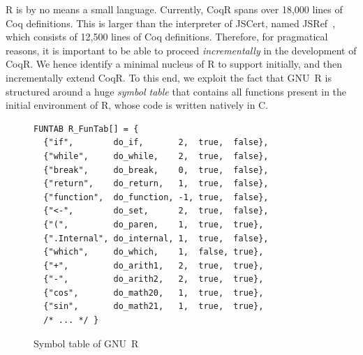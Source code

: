 \documentclass[
    sigplan,
    10pt,
    review, %
    natbib=false %
 ]{acmart}
\newcommand\mb[1]{\todo[color=purple!20,size=\scriptsize]{#1}}
\newcommand\mbi[1]{\todo[color=purple!20,inline]{#1}}
\newcommand\et[1]{\todo[color=blue!20,size=\scriptsize]{#1}}
\newcommand\CoqR{CoqR}
\begin{document}
R is by no means a small language.
Currently, \CoqR{} spans over 18,000 lines of Coq definitions.
This is larger than the interpreter of JSCert, named JSRef~\parencite{popl14jscert}, which consists of 12,500 lines of Coq definitions.
Therefore, for pragmatical reasons, it is important to be able to proceed {\em incrementally} in the development of \CoqR{}.
We hence identify a minimal nucleus of R to support initially, and then incrementally extend \CoqR{}.
To this end, we exploit the fact that GNU~R is structured around a huge {\em symbol table} that contains all functions present in the initial environment of R, whose code is written natively in C.

\begin{figure}
\begin{verbatim}
FUNTAB R_FunTab[] = {
  {"if",        do_if,       2,  true,  false},
  {"while",     do_while,    2,  true,  false},
  {"break",     do_break,    0,  true,  false},
  {"return",    do_return,   1,  true,  false},
  {"function",  do_function, -1, true,  false},
  {"<-",        do_set,      2,  true,  false},
  {"(",         do_paren,    1,  true,  true},
  {".Internal", do_internal, 1,  true,  false},
  {"which",     do_which,    1,  false, true},
  {"+",         do_arith1,   2,  true,  true},
  {"-",         do_arith2,   2,  true,  true},
  {"cos",       do_math20,   1,  true,  true},
  {"sin",       do_math21,   1,  true,  true},
  /* ... */ }
\end{verbatim}
\vspace{-1em}
    \caption{Symbol table of GNU~R}
    \label{fig:names}
\end{figure}
\end{document}
